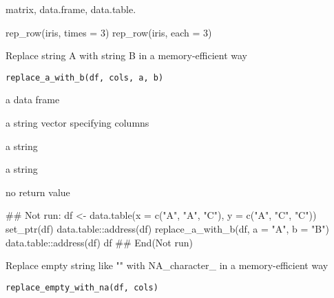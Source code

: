 \documentclass[letterpaper]{book}
\begin{document}
%
\begin{Value}
matrix, data.frame, data.table.
\end{Value}
%
\begin{Examples}
\begin{ExampleCode}
rep_row(iris, times = 3)
rep_row(iris, each  = 3)

\end{ExampleCode}
\end{Examples}
%
\begin{Description}
Replace string A with string B in a memory-efficient way
\end{Description}
%
\begin{Usage}
\begin{verbatim}
replace_a_with_b(df, cols, a, b)
\end{verbatim}
\end{Usage}
%
\begin{Arguments}
\begin{ldescription}
\item[\code{df}] a data frame

\item[\code{cols}] a string vector specifying columns

\item[\code{a}] a string

\item[\code{b}] a string
\end{ldescription}
\end{Arguments}
%
\begin{Value}
no return value
\end{Value}
%
\begin{Examples}
\begin{ExampleCode}
## Not run: 
df <- data.table(x = c("A", "A", "C"), y = c("A", "C", "C"))
set_ptr(df)
data.table::address(df)
replace_a_with_b(df, a = "A", b = "B")
data.table::address(df)
df
## End(Not run)

\end{ExampleCode}
\end{Examples}
%
\begin{Description}
Replace empty string like "" with NA\_character\_ in a memory-efficient way
\end{Description}
%
\begin{Usage}
\begin{verbatim}
replace_empty_with_na(df, cols)
\end{verbatim}
\end{Usage}
\end{document}
